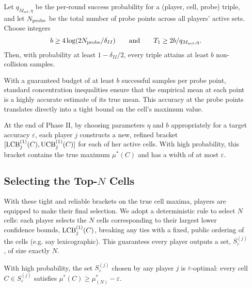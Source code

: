 \begin{lemma}\label{lem:coverage}
Let $q_{M_{act},\eta}$ be the per-round success probability for a (player, cell, probe) triple, and let $N_{\text{probe}}$ be the total number of probe points across all players' active sets. Choose integers
\[
b \ge 4\log(2N_{\text{probe}}/\delta_{II}) \qquad\text{and}\qquad T_1 \ge 2b/q_{M_{act},\eta}.
\]
Then, with probability at least $1-\delta_{II}/2$, every triple attains at least $b$ non-collision samples.
\end{lemma}

With a guaranteed budget of at least $b$ successful samples per probe point, standard concentration inequalities ensure that the empirical mean at each point is a highly accurate estimate of its true mean. This accuracy at the probe points translates directly into a tight bound on the cell's maximum value.

\begin{proposition}
\label{prop:refined-bracket}
At the end of Phase II, by choosing parameters $\eta$ and $b$ appropriately for a target accuracy $\varepsilon$, each player $j$ constructs a new, refined bracket $[\operatorname{LCB}^{(1)}_j(C), \operatorname{UCB}^{(1)}_j(C)]$ for each of her active cells. With high probability, this bracket contains the true maximum $\mu^\ast(C)$ and has a width of at most $\varepsilon$.
\end{proposition}

\subsection{Selecting the Top-$N$ Cells}
With these tight and reliable brackets on the true cell maxima, players are equipped to make their final selection. We adopt a deterministic rule to select $N$ cells: each player selects the $N$ cells corresponding to their largest lower confidence bounds, $\operatorname{LCB}^{(1)}_j(C)$, breaking any ties with a fixed, public ordering of the cells (e.g. say lexicographic). This guarantees every player outputs a set, $S^{(j)}_\varepsilon$, of size exactly $N$.

\begin{theorem}\label{thm:gapfree-safety}
With high probability, the set $S^{(j)}_\varepsilon$ chosen by any player $j$ is $\varepsilon$-optimal: every cell $C \in S^{(j)}_\varepsilon$ satisfies $\mu^\ast(C) \ge \mu^\ast_{(N)} - \varepsilon$.
\end{theorem}


